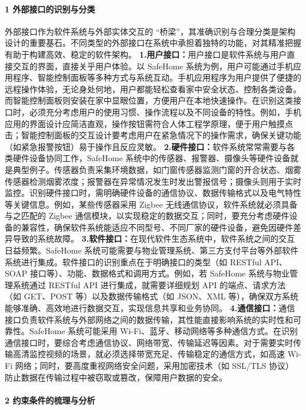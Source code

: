\paragraph{1 外部接口的识别与分类}\label{ux5916ux90e8ux63a5ux53e3ux7684ux8bc6ux522bux4e0eux5206ux7c7b} 外部接口作为软件系统与外部实体交互的
``桥梁''，其准确识别与合理分类是架构设计的重要基石。不同类型的外部接口在系统中承担着独特的功能，对其精准把握有助于构建高效、稳定的软件架构。 \textbf{1.用户接口：}用户接口是软件系统与用户直接交互的界面，直接关乎用户体验。以
SafeHome
系统为例，用户可能通过手机应用程序、智能控制面板等多种方式与系统互动。手机应用程序为用户提供了便捷的远程操作体验，无论身处何地，用户都能轻松查看家中安全状态、控制各类设备。而智能控制面板则安装在家中显眼位置，方便用户在本地快速操作。在识别这类接口时，必须充分考虑用户的使用习惯、操作流程以及不同设备的特性。例如，手机应用的界面设计应简洁直观，操作按钮需符合人体工程学原理，便于用户触摸点击；智能控制面板的交互设计要考虑用户在紧急情况下的操作需求，确保关键功能（如紧急报警按钮）易于操作且反应灵敏。
\textbf{2.硬件接口：}软件系统常常需要与各类硬件设备协同工作，SafeHome
系统中的传感器、报警器、摄像头等硬件设备就是典型例子。传感器负责采集环境数据，如门窗传感器监测门窗的开合状态、烟雾传感器检测烟雾浓度；报警器在异常情况发生时发出警报信号；摄像头则用于实时监控。识别硬件接口时，需明确硬件设备的通信协议、数据传输格式以及电气特性等关键信息。例如，某些传感器采用
Zigbee 无线通信协议，软件系统就必须具备与之匹配的 Zigbee 通信模块，以实现稳定的数据交互；同时，要充分考虑硬件设备的兼容性，确保软件系统能适应不同型号、不同厂家的硬件设备，避免因硬件差异导致的系统故障。
\textbf{3.软件接口：}在现代软件生态系统中，软件系统之间的交互日益频繁。SafeHome 系统可能需要与物业管理系统、第三方支付平台等外部软件系统进行集成。软件接口的识别重点在于明确接口的类型（如 RESTful API、SOAP
接口等）、功能、数据格式和调用方式。例如，若 SafeHome 系统与物业管理系统通过 RESTful API 进行集成，就需要详细规划 API 的端点、请求方法（如 GET、POST 等）以及数据传输格式（如 JSON、XML
等），确保双方系统能够准确、高效地进行数据交互，实现信息共享和业务协同。 \textbf{4.通信接口：}通信接口负责软件系统与外部网络之间的数据传输，其性能直接影响系统的实时性和可靠性。SafeHome 系统可能采用
Wi-Fi、蓝牙、移动网络等多种通信方式。在识别通信接口时，要综合考虑通信协议、网络带宽、传输延迟等因素。对于需要实时传输高清监控视频的场景，就必须选择带宽充足、传输稳定的通信方式，如高速 Wi-Fi
网络；同时，要高度重视网络安全问题，采用加密技术（如 SSL/TLS 协议）防止数据在传输过程中被窃取或篡改，保障用户数据的安全。 \paragraph{2
约束条件的梳理与分析}\label{ux7ea6ux675fux6761ux4ef6ux7684ux68b3ux7406ux4e0eux5206ux6790}
